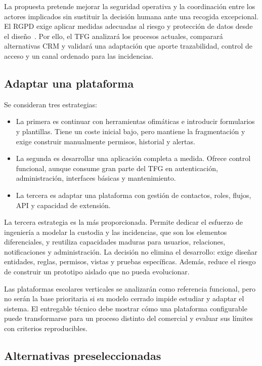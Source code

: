 La propuesta pretende mejorar la seguridad operativa y la coordinación entre los actores implicados sin sustituir la decisión humana ante una recogida excepcional. El RGPD exige aplicar medidas adecuadas al riesgo y protección de datos desde el diseño~\cite{ref03}. Por ello, el TFG analizará los procesos actuales, comparará alternativas CRM y validará una adaptación que aporte trazabilidad, control de acceso y un canal ordenado para las incidencias.

\subsection{Adaptar una plataforma}\label{sec:1-2-3}

Se consideran tres estrategias:

\begin{itemize}
  \item La primera es continuar con herramientas ofimáticas e introducir formularios y plantillas. Tiene un coste inicial bajo, pero mantiene la fragmentación y exige construir manualmente permisos, historial y alertas.
  \item La segunda es desarrollar una aplicación completa a medida. Ofrece control funcional, aunque consume gran parte del TFG en autenticación, administración, interfaces básicas y mantenimiento.
  \item La tercera es adaptar una plataforma con gestión de contactos, roles, flujos, API y capacidad de extensión.
\end{itemize}

La tercera estrategia es la más proporcionada. Permite dedicar el esfuerzo de ingeniería a modelar la custodia y las incidencias, que son los elementos diferenciales, y reutiliza capacidades maduras para usuarios, relaciones, notificaciones y administración. La decisión no elimina el desarrollo: exige diseñar entidades, reglas, permisos, vistas y pruebas específicas. Además, reduce el riesgo de construir un prototipo aislado que no pueda evolucionar.

Las plataformas escolares verticales se analizarán como referencia funcional, pero no serán la base prioritaria si su modelo cerrado impide estudiar y adaptar el sistema. El entregable técnico debe mostrar cómo una plataforma configurable puede transformarse para un proceso distinto del comercial y evaluar sus límites con criterios reproducibles.

\subsection{Alternativas preseleccionadas}\label{sec:1-2-4}

